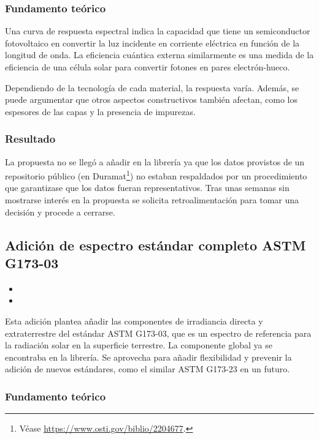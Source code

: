 \subsubsection{Fundamento teórico}

Una curva de respuesta espectral indica la capacidad que tiene un semiconductor fotovoltaico en convertir la luz incidente en corriente eléctrica en función de la longitud de onda. La eficiencia cuántica externa similarmente es una medida de la eficiencia de una célula solar para convertir fotones en pares electrón-hueco.

Dependiendo de la tecnología de cada material, la respuesta varía. Además, se puede argumentar que otros aspectos constructivos también afectan, como los espesores de las capas y la presencia de impurezas.

\subsubsection{Resultado}

La propuesta no se llegó a añadir en la librería ya que los datos provistos de un repositorio público (en Duramat\footnote{Véase \url{https://www.osti.gov/biblio/2204677}.}) no estaban respaldados por un procedimiento que garantizase que los datos fueran representativos. Tras unas semanas sin mostrarse interés en la propuesta se solicita retroalimentación para tomar una decisión y procede a cerrarse.

\subsection{Adición de espectro estándar completo ASTM G173-03}

\begin{itemize}
    \item {}
    \item {}
\end{itemize}

Esta adición plantea añadir las componentes de irradiancia directa y extraterrestre del estándar ASTM G173-03, que es un espectro de referencia para la radiación solar en la superficie terrestre. La componente global ya se encontraba en la librería. Se aprovecha para añadir flexibilidad y prevenir la adición de nuevos estándares, como el similar ASTM G173-23 en un futuro.

\subsubsection{Fundamento teórico}

